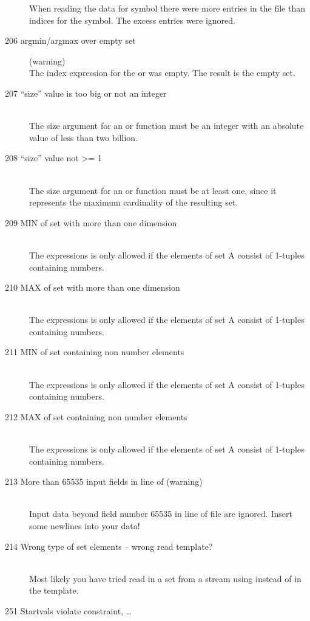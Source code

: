 \begin{description}
  When reading the data for symbol  there were 
   more entries in the file than indices for the symbol.
  The excess entries were ignored.  
\item[206 argmin/argmax over empty set] (warning)\ \\
   The index expression for the  or  was
   empty. The result is the empty set.
\item[207 ``size'' value \code{xxx} is too big or not an integer]\ \\
   The size argument for an  or  function
   must be an integer with an absolute value of less than two billion.
\item[208 ``size'' value \code{xxx} not >= 1]\ \\
   The size argument for an  or  function
   must be at least one, since it represents the maximum cardinality
   of the resulting set.
\item[209 MIN of set with more than one dimension]\ \\
   The expressions  is only allowed if the elements of 
   set A consist of 1-tuples containing numbers.  
\item[210 MAX of set with more than one dimension]\ \\
   The expressions  is only allowed if the elements of 
   set A consist of 1-tuples containing numbers.  
\item[211 MIN of set containing non number elements]\ \\
   The expressions  is only allowed if the elements of 
   set A consist of 1-tuples containing numbers.  
\item[212 MAX of set containing non number elements]\ \\
   The expressions  is only allowed if the elements of 
   set A consist of 1-tuples containing numbers.  
\item[213 More than 65535 input fields in line \code{xxx} of
   \code{yyy} (warning)]\ \\
   Input data beyond field number 65535 in line  of file
    are ignored. Insert some newlines into your data!
\item[214 Wrong type of set elements -- wrong read template?]\ \\
   Most likely you have tried read in a set from a stream using
    instead of  in the template. 
\item[251 Startvals violate constraint, \ldots]\ \\

\end{description}
